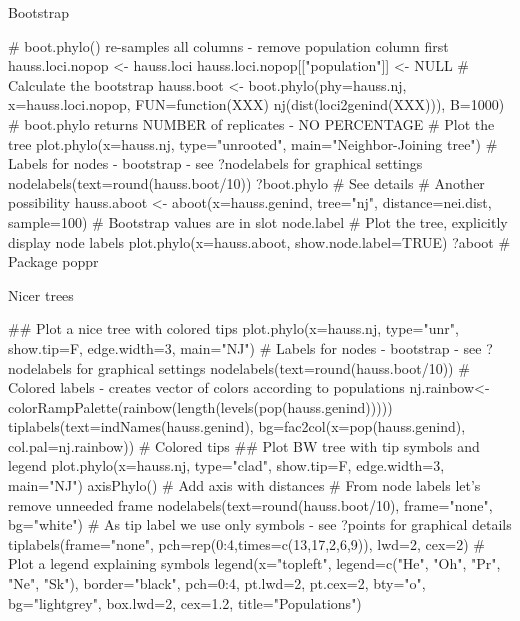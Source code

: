 \documentclass[compress, ucs, xelatex, 11pt, xcolor=svgnames,
  hyperref={
    bookmarks=true,
    unicode=true,
    colorlinks=true,
    pdftitle={Molecular data in R},
    plainpages=false,
    pdfauthor={Vojtech Zeisek},
    pdfsubject={Course about phylogeny and evolution in R},
    pdfcreator={XeLaTeX},
    pdfkeywords={R, evolution, phylogeny, molecular data},
    linkcolor=Tomato,
    anchorcolor=SaddleBrown,
    citecolor=Goldenrod,
    filecolor=DarkMagenta,
    menucolor=Sienna,
    urlcolor=DarkTurquoise,
    pdftex},
  url={hyphens, lowtilde} %
  ]{beamer}
\begin{document}
\begin{frame}[fragile]{Bootstrap}
  \begin{spluscode}
    # boot.phylo() re-samples all columns - remove population column first
    hauss.loci.nopop <- hauss.loci
    hauss.loci.nopop[["population"]] <- NULL
    # Calculate the bootstrap
    hauss.boot <- boot.phylo(phy=hauss.nj, x=hauss.loci.nopop,
      FUN=function(XXX) nj(dist(loci2genind(XXX))), B=1000)
    # boot.phylo returns NUMBER of replicates - NO PERCENTAGE
    # Plot the tree
    plot.phylo(x=hauss.nj, type="unrooted", main="Neighbor-Joining tree")
    # Labels for nodes - bootstrap - see ?nodelabels for graphical settings
    nodelabels(text=round(hauss.boot/10))
    ?boot.phylo # See details
    # Another possibility
    hauss.aboot <- aboot(x=hauss.genind, tree="nj", distance=nei.dist,
      sample=100) # Bootstrap values are in slot node.label
    # Plot the tree, explicitly display node labels
    plot.phylo(x=hauss.aboot, show.node.label=TRUE)
    ?aboot # Package poppr
  \end{spluscode}
\end{frame}

\begin{frame}[fragile]{Nicer trees}
  \begin{footnotesize}
  \begin{spluscode}
    ## Plot a nice tree with colored tips
    plot.phylo(x=hauss.nj, type="unr", show.tip=F, edge.width=3, main="NJ")
    # Labels for nodes - bootstrap - see ?nodelabels for graphical settings
    nodelabels(text=round(hauss.boot/10))
    # Colored labels - creates vector of colors according to populations
    nj.rainbow<-colorRampPalette(rainbow(length(levels(pop(hauss.genind)))))
    tiplabels(text=indNames(hauss.genind), bg=fac2col(x=pop(hauss.genind), 
      col.pal=nj.rainbow)) # Colored tips
    ## Plot BW tree with tip symbols and legend
    plot.phylo(x=hauss.nj, type="clad", show.tip=F, edge.width=3, main="NJ")
    axisPhylo() # Add axis with distances
    # From node labels let's remove unneeded frame
    nodelabels(text=round(hauss.boot/10), frame="none", bg="white")
    # As tip label we use only symbols - see ?points for graphical details
    tiplabels(frame="none", pch=rep(0:4,times=c(13,17,2,6,9)), lwd=2, cex=2)
    # Plot a legend explaining symbols
    legend(x="topleft", legend=c("He", "Oh", "Pr", "Ne", "Sk"), 
      border="black", pch=0:4, pt.lwd=2, pt.cex=2, bty="o", bg="lightgrey",
      box.lwd=2, cex=1.2, title="Populations")
  \end{spluscode}
  \end{footnotesize}
\end{frame}
\end{document}
